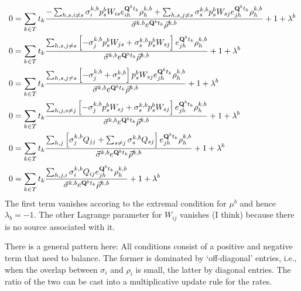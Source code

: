 \documentclass[aps,rmp, onecolumn]{revtex4}
\newcommand{\mat}[1]{{\bf #1}}
\newcommand{\eqp}{p}
\begin{document}
\begin{equation}
\begin{split}
	0 & = \sum_{k\in T} t_k \frac{-\sum_{h,s,i\neq s}\sigma^{k,b}_i \eqp^b_s W_{is}e^{\mat{Q}^{b}t_k}_{ih} \rho^{k,b}_h + \sum_{h,s, j\neq s}\sigma^{k,b}_s \eqp^b_s W_{sj} e^{\mat{Q}^{b}t_k}_{jh} \rho^{k,b}_h}{\vec{\sigma}^{k,b} e^{\mat{Q}^{b}t_k} \vec{\rho}^{k,b}} + 1 + \lambda^b \\
	0 & = \sum_{k\in T} t_k \frac{\sum_{h,s,j\neq s} \left[-\sigma^{k,b}_j \eqp^b_s W_{js} + \sigma^{k,b}_s \eqp^b_s W_{sj}\right] e^{\mat{Q}^{b}t_k}_{jh} \rho^{k,b}_h}{\vec{\sigma}^{k,b} e^{\mat{Q}^{b}t_k} \vec{\rho}^{k,b}} + 1 + \lambda^b \\
	0 & = \sum_{k\in T} t_k \frac{\sum_{h,s,j\neq s} \left[-\sigma^{k,b}_j + \sigma^{k,b}_s\right]  \eqp^b_s W_{sj}e^{\mat{Q}^{b}t_k}_{jh} \rho^{k,b}_h}{\vec{\sigma}^{k,b} e^{\mat{Q}^{b}t_k} \vec{\rho}^{k,b}} + 1 + \lambda^b \\
	0 & = \sum_{k\in T} t_k \frac{\sum_{h,j,s\neq j} \left[-\sigma^{k,b}_j\eqp^b_s W_{sj} + \sigma^{k,b}_s\eqp^b_s W_{sj}\right]  e^{\mat{Q}^{b}t_k}_{jh} \rho^{k,b}_h}{\vec{\sigma}^{k,b} e^{\mat{Q}^{b}t_k} \vec{\rho}^{k,b}} + 1 + \lambda^b\\
	0 & = \sum_{k\in T} t_k \frac{\sum_{h,j} \left[\sigma^{k,b}_jQ_{jj} + \sum_{s\neq j}\sigma^{k,b}_sQ_{sj}\right]  e^{\mat{Q}^{b}t_k}_{jh} \rho^{k,b}_h}{\vec{\sigma}^{k,b} e^{\mat{Q}^{b}t_k} \vec{\rho}^{k,b}} + 1 + \lambda^b\\
	0 & = \sum_{k\in T} t_k \frac{\sum_{h,j,i} \sigma^{k,b}_i Q_{ij} e^{\mat{Q}^{b}t_k}_{jh} \rho^{k,b}_h}{\vec{\sigma}^{k,b} e^{\mat{Q}^{b}t_k} \vec{\rho}^{k,b}} + 1 + \lambda^b
\end{split}
\end{equation}
The first term vanishes accoring to the extremal condition for $\mu^b$ and hence $\lambda_b=-1$.
The other Lagrange parameter for $W_{ij}$ vanishes (I think) because there is no source associated with it.

There is a general pattern here: All conditions consist of a positive and negative term that need to balance.
The former is dominated by `off-diagonal' entries, i.e., when the overlap between $\sigma_i$ and $\rho_i$ is small, the latter by diagonal entries.
The ratio of the two can be cast into a multiplicative update rule for the rates.
\end{document}
